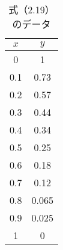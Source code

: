 \begin{table}[h]
  \begin{center}
    \caption{式（2.19）のデータ}
    \begin{tabular}{|c|c|} \hline
      $x$ & $y$   \\ \hline \hline
      0   & 1     \\ \hline
      0.1 & 0.73  \\ \hline
      0.2 & 0.57  \\ \hline
      0.3 & 0.44  \\ \hline
      0.4 & 0.34  \\ \hline
      0.5 & 0.25  \\ \hline
      0.6 & 0.18  \\ \hline
      0.7 & 0.12  \\ \hline
      0.8 & 0.065 \\ \hline
      0.9 & 0.025 \\ \hline
      1   & 0     \\ \hline
    \end{tabular}
    \label{tab:log}
  \end{center}
\end{table}
